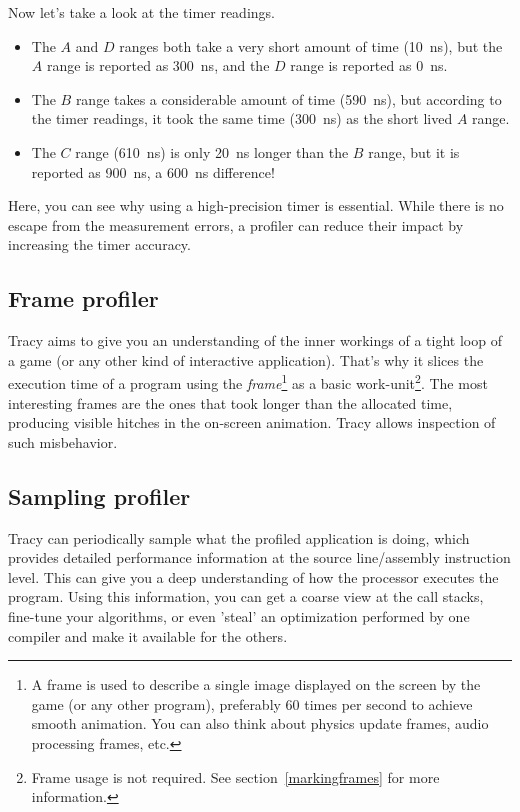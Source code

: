 \documentclass[hidelinks,titlepage,a4paper,twoside]{article}
\begin{document}
Now let's take a look at the timer readings.

\begin{itemize}
\item The $A$ and $D$ ranges both take a very short amount of time (10~\si{\nano\second}), but the $A$ range is reported as 300~\si{\nano\second}, and the $D$ range is reported as 0~\si{\nano\second}.
\item The $B$ range takes a considerable amount of time (590~\si{\nano\second}), but according to the timer readings, it took the same time (300~\si{\nano\second}) as the short lived $A$ range.
\item The $C$ range (610~\si{\nano\second}) is only 20~\si{\nano\second} longer than the $B$ range, but it is reported as 900~\si{\nano\second}, a 600~\si{\nano\second} difference!
\end{itemize}

Here, you can see why using a high-precision timer is essential. While there is no escape from the measurement errors, a profiler can reduce their impact by increasing the timer accuracy.

\subsection{Frame profiler}

Tracy aims to give you an understanding of the inner workings of a tight loop of a game (or any other kind of interactive application). That's why it slices the execution time of a program using the \emph{frame}\footnote{A frame is used to describe a single image displayed on the screen by the game (or any other program), preferably 60 times per second to achieve smooth animation. You can also think about physics update frames, audio processing frames, etc.} as a basic work-unit\footnote{Frame usage is not required. See section~\ref{markingframes} for more information.}. The most interesting frames are the ones that took longer than the allocated time, producing visible hitches in the on-screen animation. Tracy allows inspection of such misbehavior.

\subsection{Sampling profiler}

Tracy can periodically sample what the profiled application is doing, which provides detailed performance information at the source line/assembly instruction level. This can give you a deep understanding of how the processor executes the program. Using this information, you can get a coarse view at the call stacks, fine-tune your algorithms, or even 'steal' an optimization performed by one compiler and make it available for the others.
\end{document}
